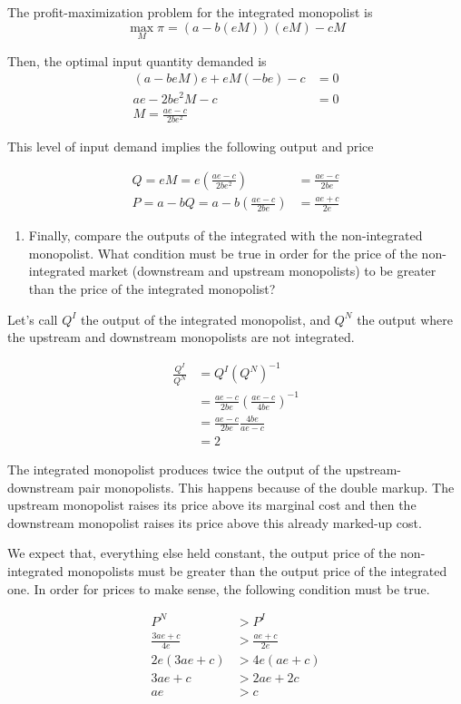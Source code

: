 \documentclass[
]{article}
\providecommand{\tightlist}{%
  \setlength{\itemsep}{0pt}\setlength{\parskip}{0pt}}\usepackage{longtable,booktabs,array}
\begin{document}
The profit-maximization problem for the integrated monopolist is \[
\max_M \pi = (a-b(eM))(eM)-cM
\]

Then, the optimal input quantity demanded is \[
\begin{aligned}
    (a-beM)e+eM(-be)-c &=0\\
    ae-2be^2M-c&=0\\
    M=\frac{ae-c}{2be^2}
\end{aligned}
\]

This level of input demand implies the following output and price

\[
\begin{aligned}
    Q=eM=e\left(\frac{ae-c}{2be^2}\right)&=\frac{ae-c}{2be} \\
    P=a-bQ=a-b\left(\frac{ae-c}{2be}\right)&=\frac{ae+c}{2e}
\end{aligned}
\]

\begin{enumerate}
\def\labelenumi{\alph{enumi}.}
\setcounter{enumi}{6}
\tightlist
\item
  Finally, compare the outputs of the integrated with the non-integrated
  monopolist. What condition must be true in order for the price of the
  non-integrated market (downstream and upstream monopolists) to be
  greater than the price of the integrated monopolist?
\end{enumerate}

Let's call \(Q^I\) the output of the integrated monopolist, and \(Q^N\)
the output where the upstream and downstream monopolists are not
integrated.

\[
\begin{aligned}
    \frac{Q^I}{Q^N} &= Q^I (Q^N)^{-1}\\
                    &=\frac{ae-c}{2be}\left(\frac{ae-c}{4be}\right)^{-1} \\
                    &= \frac{ae-c}{2be}\frac{4be}{ae-c} \\
                    &= 2
\end{aligned}
\]

The integrated monopolist produces twice the output of the
upstream-downstream pair monopolists. This happens because of the double
markup. The upstream monopolist raises its price above its marginal cost
and then the downstream monopolist raises its price above this already
marked-up cost.

We expect that, everything else held constant, the output price of the
non-integrated monopolists must be greater than the output price of the
integrated one. In order for prices to make sense, the following
condition must be true.

\[
\begin{aligned}
    P^N &> P^I \\
    \frac{3ae+c}{4e}&>\frac{ae+c}{2e}\\
    2e(3ae+c)&>4e(ae+c)\\
    3ae+c &> 2ae+2c \\
    ae &> c
\end{aligned}
\]
\end{document}

